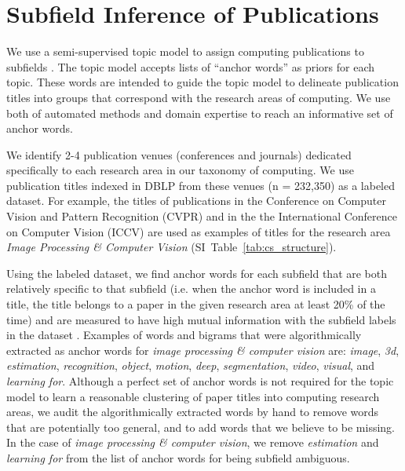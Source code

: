 \documentclass[reprint, twocolumn, aps, nofootinbib, superscriptaddress, longbibliography]{revtex4-1}
\begin{document}
\section{Subfield Inference of Publications}\label{sec:si_word_extraction} 
We use a semi-supervised topic model to assign computing publications to subfields \cite{gallagher2017anchored}. The topic model accepts lists of ``anchor words'' as priors for each topic. These words are intended to guide the topic model to delineate publication titles into groups that correspond with the research areas of computing. We use both of automated methods and domain expertise to reach an informative set of anchor words. 

We identify 2-4 publication venues (conferences and journals) dedicated specifically to each research area in our taxonomy of computing. We use publication titles indexed in DBLP from these venues (n = 232,350) as a labeled dataset. For example, the titles of publications in the Conference on Computer Vision and Pattern Recognition (CVPR) and in the the International Conference on Computer Vision (ICCV) are used as examples of titles for the research area \emph{Image Processing \& Computer Vision} (SI~Table~\ref{tab:cs_structure}). 

Using the labeled dataset, we find anchor words for each subfield that are both relatively specific to that subfield (i.e. when the anchor word is included in a title, the title belongs to a paper in the given research area at least 20\% of the time) and are measured to have high mutual information with the subfield labels in the dataset \cite{jagarlamudi2012incorporating}. Examples of words and bigrams that were algorithmically extracted as anchor words for \emph{image processing \& computer vision} are: \emph{image}, \emph{3d}, \emph{estimation}, \emph{recognition}, \emph{object}, \emph{motion}, \emph{deep}, \emph{segmentation}, \emph{video}, \emph{visual}, and \emph{learning for}. Although a perfect set of anchor words is not required for the topic model to learn a reasonable clustering of paper titles into computing research areas, we audit the algorithmically extracted words by hand to remove words that are potentially too general, and to add words that we believe to be missing. In the case of \emph{image processing \& computer vision}, we remove \emph{estimation} and \emph{learning for} from the list of anchor words for being subfield ambiguous. 
\end{document}
